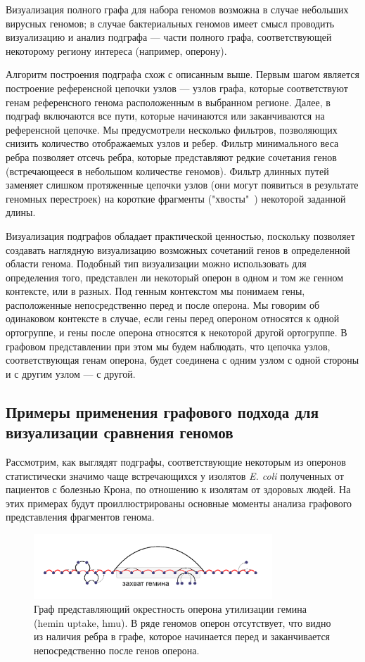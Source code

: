 Визуализация полного графа для набора геномов возможна в случае небольших вирусных геномов; в случае бактериальных геномов имеет смысл проводить визуализацию и анализ подграфа --- части полного графа, соответствующей некоторому региону интереса (например, оперону).

Алгоритм построения подграфа схож с описанным выше. Первым шагом является построение референсной цепочки узлов --- узлов графа, которые соответствуют генам референсного генома расположенным в выбранном регионе. Далее, в подграф включаются все пути, которые начинаются или заканчиваются на референсной цепочке. Мы предусмотрели несколько фильтров, позволяющих снизить количество отображаемых узлов и ребер. Фильтр минимального веса ребра позволяет отсечь ребра, которые представляют редкие сочетания генов (встречающееся в небольшом количестве геномов). Фильтр длинных путей заменяет слишком протяженные цепочки узлов (они могут появиться в результате геномных перестроек) на короткие фрагменты ("хвосты"\ ) некоторой заданной длины. 

Визуализация подграфов обладает практической ценностью, поскольку позволяет создавать наглядную визуализацию возможных сочетаний генов в определенной области генома. Подобный тип визуализации можно использовать для определения того, представлен ли некоторый оперон в одном и том же генном контексте, или в разных. Под генным контекстом мы понимаем гены, расположенные непосредственно перед и после оперона. Мы говорим об одинаковом контексте в случае, если гены перед опероном относятся к одной ортогруппе, и гены после оперона относятся к некоторой другой ортогруппе. В графовом представлении при этом мы будем наблюдать, что цепочка узлов, соответствующая генам оперона, будет соединена с одним узлом с одной стороны и с другим узлом --- с другой. 


\subsection*{Примеры применения графового подхода для визуализации сравнения геномов}

Рассмотрим, как выглядят подграфы, соответствующие некоторым из оперонов статистически значимо чаще встречающихся у изолятов \textit{E. coli} полученных от пациентов с болезнью Крона, по отношению к изолятам от здоровых людей. На этих примерах будут проиллюстрированы основные моменты анализа графового представления фрагментов генома. 


\begin{figure}[!ht] 
  \center
  \includegraphics[width=0.8\textwidth]{Dissertation/images/subgraphs/hemin.png}
  \caption{Граф представляющий окрестность оперона утилизации гемина (hemin uptake, hmu). В ряде геномов оперон отсутствует, что видно из наличия ребра в графе, которое начинается перед и заканчивается непосредственно после генов оперона. }
  \label{img:sub_hem} 
\end{figure}


